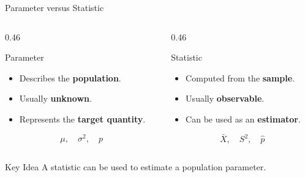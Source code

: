\documentclass{beamer}
\begin{document}
\begin{frame}{Parameter versus Statistic}

\begin{columns}[T,onlytextwidth]

\begin{column}{0.46\textwidth}

\begin{block}{Parameter}
\begin{itemize}
    \item Describes the \textbf{population}.
    \item Usually \textbf{unknown}.
    \item Represents the \textbf{target quantity}.
\end{itemize}

\vspace{0.15cm}

\begin{center}
\[
\boxed{
\mu,\quad \sigma^2,\quad p
}
\]
\end{center}

\end{block}

\end{column}

\hfill

\begin{column}{0.46\textwidth}

\begin{block}{Statistic}
\begin{itemize}
    \item Computed from the \textbf{sample}.
    \item Usually \textbf{observable}.
    \item Can be used as an \textbf{estimator}.
\end{itemize}

\vspace{0.15cm}

\begin{center}
\[
\boxed{
\bar{X},\quad S^2,\quad \hat{p}
}
\]
\end{center}

\end{block}

\end{column}

\end{columns}

\vspace{0.4cm}

\begin{block}{Key Idea}
A statistic can be used to estimate a population parameter.
\end{block}

\end{frame}
\end{document}
